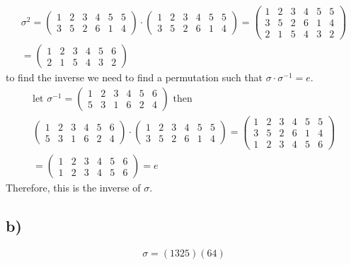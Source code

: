 \documentclass[]{scrartcl}
\begin{document}
\begin{gather*}
	\sigma^2 = 
	\begin{pmatrix}
		1 & 2 & 3 & 4 & 5 & 5\\
		3 & 5 & 2 & 6 & 1 & 4
	\end{pmatrix} \cdot
	\begin{pmatrix}
		1 & 2 & 3 & 4 & 5 & 5\\
		3 & 5 & 2 & 6 & 1 & 4
	\end{pmatrix}
	=
	\begin{pmatrix}
		1 & 2 & 3 & 4 & 5 & 5\\
		3 & 5 & 2 & 6 & 1 & 4\\
		2 & 1 & 5 & 4 & 3 & 2
	\end{pmatrix}\\
	=
	\begin{pmatrix}
		1 & 2 & 3 & 4 & 5 & 6\\
		2 & 1 & 5 & 4 & 3 & 2
	\end{pmatrix}
\end{gather*}
to find the inverse we need to find a permutation such that $\sigma\cdot\sigma^{-1} = e$.
\begin{gather*}
	\text{let } \sigma^{-1} = 
	\begin{pmatrix}
		1 & 2 & 3 & 4 & 5 & 6\\
		5 & 3 & 1 & 6 & 2 & 4
	\end{pmatrix}
	\text{ then}\\
	\begin{pmatrix}
		1 & 2 & 3 & 4 & 5 & 6\\
		5 & 3 & 1 & 6 & 2 & 4
	\end{pmatrix} \cdot
	\begin{pmatrix}
		1 & 2 & 3 & 4 & 5 & 5\\
		3 & 5 & 2 & 6 & 1 & 4
	\end{pmatrix}
	=
	\begin{pmatrix}
		1 & 2 & 3 & 4 & 5 & 5\\
		3 & 5 & 2 & 6 & 1 & 4\\
		1 & 2 & 3 & 4 & 5 & 6
	\end{pmatrix}\\
	=
	\begin{pmatrix}
		1 & 2 & 3 & 4 & 5 & 6\\
		1 & 2 & 3 & 4 & 5 & 6
	\end{pmatrix} = e
\end{gather*}
Therefore, this is the inverse of $\sigma$.

\subsection{b)}
$$
\sigma = (1325)(64)
$$
\end{document}
